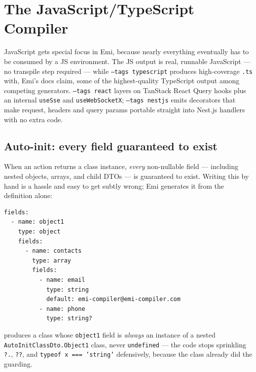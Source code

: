 \section{The JavaScript/TypeScript Compiler}
\label{sec:js-compiler}

JavaScript gets special focus in Emi, because nearly everything eventually
has to be consumed by a JS environment. The JS output is real, runnable
JavaScript --- no transpile step required --- while \texttt{--tags
typescript} produces high-coverage \texttt{.ts} with, Emi's docs claim,
some of the highest-quality TypeScript output among competing generators.
\texttt{--tags react} layers on TanStack React Query hooks plus an
internal \texttt{useSse} and \texttt{useWebSocketX}; \texttt{--tags
nestjs} emits decorators that make request, headers and query params
portable straight into Nest.js handlers with no extra code.

\subsection{Auto-init: every field guaranteed to exist}
When an action returns a class instance, \emph{every} non-nullable field
--- including nested objects, arrays, and child DTOs --- is guaranteed to
exist. Writing this by hand is a hassle and easy to get subtly wrong;
Emi generates it from the definition alone:
\begin{lstlisting}
fields:
  - name: object1
    type: object
    fields:
      - name: contacts
        type: array
        fields:
          - name: email
            type: string
            default: emi-compiler@emi-compiler.com
          - name: phone
            type: string?
\end{lstlisting}
produces a class whose \texttt{object1} field is \emph{always} an
instance of a nested \texttt{AutoInitClassDto.Object1} class, never
\texttt{undefined} --- the code stops sprinkling \texttt{?.}, \texttt{??},
and \texttt{typeof x === 'string'} defensively, because the class already
did the guarding.

